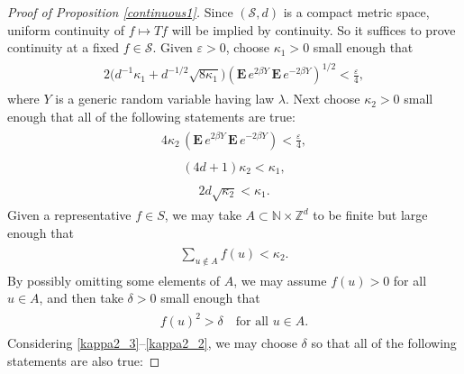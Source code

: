 \documentclass[11pt,reqno]{amsart}
\numberwithin{equation}{section}
\theoremstyle{definition}
\begin{document}
\begin{proof}[Proof of Proposition \ref{continuous1}]
Since $({\mathcal{S}},d)$ is a compact metric space, uniform continuity of $f \mapsto Tf$ will be implied by continuity.
So it suffices to prove continuity at a fixed $f \in {\mathcal{S}}$.
Given ${\varepsilon} > 0$, choose $\kappa_1 > 0$ small enough that
{\begin{align} \begin{split} {
2\big(d^{-1}\kappa_1 + d^{-1/2}\sqrt{8\kappa_1}\big) ({\mathbf{E}}\, e^{2\beta Y}\, {\mathbf{E}}\, e^{-2\beta Y})^{1/2} < \frac{\varepsilon}{4}, \label{kappa1_1}
} \end{split} \end{align}}
where $Y$ is a generic random variable having law $\lambda$.
Next choose $\kappa_2 > 0$ small enough that all of the following statements are true:
{\begin{align} \begin{split} {
4\kappa_2\, ({\mathbf{E}}\, e^{2\beta Y}\, {\mathbf{E}}\, e^{-2\beta Y}) < \frac{\varepsilon}{4}, \label{kappa2_3}
} \end{split} \end{align}}
{\begin{align} \begin{split} {
(4d+1)\kappa_2 < \kappa_1, \label{kappa2_1}
} \end{split} \end{align}}
{\begin{align} \begin{split} {
2d\sqrt{\kappa_2} < \kappa_1. \label{kappa2_2}
} \end{split} \end{align}}
Given a representative $f \in S$, we may take $A \subset {\mathbb{N}} \times {\mathbb{Z}}^d$ to be finite but large enough that
{\begin{align} \begin{split} {
\sum_{u \notin A} f(u) < \kappa_2. \label{notAsum}
} \end{split} \end{align}}
By possibly omitting some elements of $A$, we may assume $f(u) > 0$ for all $u \in A$, and then take $\delta > 0$ small enough that
{\begin{align} \begin{split} {
f(u)^2 > \delta \quad \text{for all $u \in A$} \label{pointwiseA}.
} \end{split} \end{align}}
Considering \eqref{kappa2_3}--\eqref{kappa2_2}, we may choose $\delta$ so that all of the following statements are also true:

\end{proof}
\end{document}
